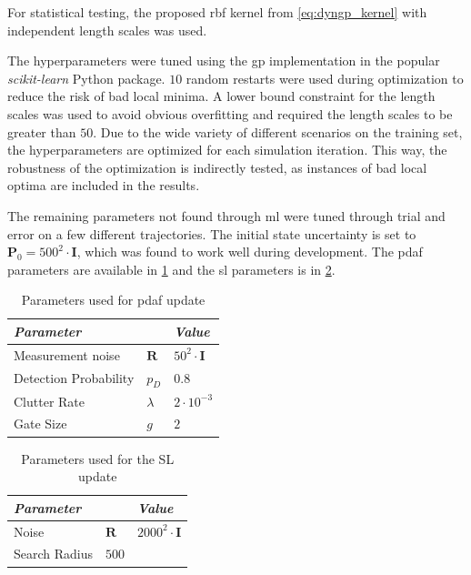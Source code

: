 For statistical testing, the proposed \acrshort{rbf} kernel from \cref{eq:dyngp_kernel} with independent length scales was used.

The hyperparameters were tuned using the \acrshort{gp} implementation in the popular \textit{scikit-learn} \cite{scikit-learn} Python package. $10$ random restarts were used during optimization to reduce the risk of bad local minima. A lower bound constraint for the length scales was used to avoid obvious overfitting and required the length scales to be greater than $50$. Due to the wide variety of different scenarios on the training set, the hyperparameters are optimized for each simulation iteration. This way, the robustness of the optimization is indirectly tested, as instances of bad local optima are included in the results.


The remaining parameters not found through \acrshort{ml} were tuned through trial and error on a few different trajectories.
The initial state uncertainty is set to $\boldsymbol{P}_0 = 500^2 \cdot \boldsymbol{I}$, which was found to work well during development. The \acrshort{pdaf} parameters are available in \cref{table:stats_pdaf_params} and the \acrshort{sl} parameters is in \cref{table:stats_sl_params}.

\begin{table}[h]
    \centering
    \begin{tabular}{lll}
        \textit{\textbf{Parameter}} &                  & \textit{\textbf{Value}}     \\ \hline
        Measurement noise           & $\boldsymbol{R}$ & $50^2 \cdot \boldsymbol{I}$ \\
        Detection Probability       & $p_D$            & $0.8$                       \\
        Clutter Rate                & $\lambda$        & $2 \cdot 10^{-3}$           \\
        Gate Size                   & $g$              & $2$
    \end{tabular}
    \caption{Parameters used for \acrshort{pdaf} update}
    \label{table:stats_pdaf_params}
\end{table}

\begin{table}[h]
    \centering
    \begin{tabular}{lll}
        \textit{\textbf{Parameter}} &                  & \textit{\textbf{Value}}       \\ \hline
        Noise                       & $\boldsymbol{R}$ & $2000^2 \cdot \boldsymbol{I}$ \\
        Search Radius               & $500$
    \end{tabular}
    \caption{Parameters used for the SL update}
    \label{table:stats_sl_params}
\end{table}

